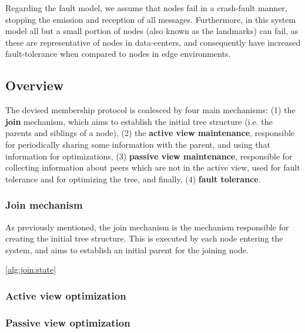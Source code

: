 Regarding the fault model, we assume that nodes fail in a crash-fault manner, stopping the emission and reception of all messages. Furthermore, in this system model all but a small portion of nodes (also known as the landmarks) can fail, as these are representative of nodes in data-centers, and consequently have increased fault-tolerance when compared to nodes in edge environments.

\subsection{Overview}

The devised membership protocol is coalesced by four main mechanisms: (1) the \textbf{join} mechanism, which aims to establish the initial tree structure (i.e. the parents and siblings of a node), (2) the \textbf{active view maintenance}, responsible for periodically sharing some information with the parent, and using that information for optimizations, (3) \textbf{passive view maintenance}, responsible for collecting information about peers which are not in the active view, used for fault tolerance and for optimizing the tree, and finally, (4) \textbf{fault tolerance}.

\subsubsection{Join mechanism}

As previously mentioned, the join mechanism is the mechanism responsible for creating the initial tree structure. This is executed by each node entering the system, and aims to establish an initial parent for the joining node.

\ref{alg:join:state}



\subsubsection{Active view optimization}



\subsubsection{Passive view optimization}



